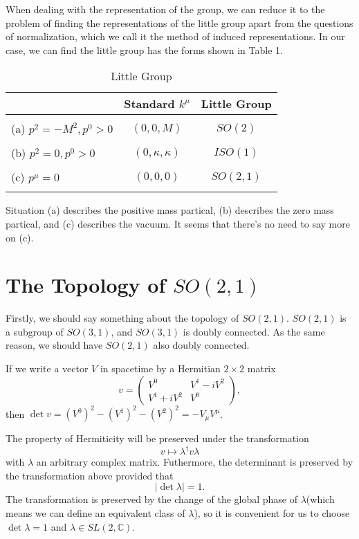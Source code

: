 \documentclass[11pt]{article}
\begin{document}
When dealing with the representation of the group, we can reduce it to the problem of finding the representations of the little group apart from the questions of normalization, which we call it the method of induced representations.\cite{2} In our case, we can find the little group has the forms shown in Table 1.
\begin{table}[ht]
\centering
\begin{tabular}{l c c}
&Standard $k^\mu$ & Little Group\\
\hline \\
(a) $p^2=-M^2,p^0>0$ & $(0,0,M)$ & $SO\left(2\right)$\\
\\
(b) $p^2=0,p^0>0$ & $(0,\kappa,\kappa)$ & $ISO\left(1\right)$\\
\\
(c) $p^\mu=0$ & $(0,0,0)$ & $SO\left(2,1\right)$\\
\\
\hline
\end{tabular}
\caption{Little Group}
\end{table}

Situation (a) describes the positive mass partical, (b) describes the zero mass partical, and (c) describes the vacuum. It seems that there's no need to say more on (c).

\section{The Topology of $SO(2,1)$}
Firstly, we should say something about the topology of $SO(2,1)$. $SO(2,1)$ is a subgroup of $SO(3,1)$, and $SO(3,1)$ is doubly connected. As the same reason, we should have  $SO(2,1)$ also doubly connected.

If we write a vector $V$ in spacetime by a Hermitian $2\times 2$ matrix
\[
	v=\begin{pmatrix}
		V^0&V^1-iV^2\\
		V^1+iV^2&V^0
	\end{pmatrix},
\]
then $\det v=(V^0)^2-(V^1)^2-(V^2)^2=-V_\mu V^\mu$.

The property of Hermiticity will be preserved under the transformation
\[
	v \mapsto \lambda^\dag v \lambda
\]
with $\lambda$ an arbitrary complex matrix. Futhermore, the determinant is preserved by the transformation above provided that
\[
\left|\det \lambda\right|=1.
\]
The transformation is preserved by the change of the global phase of $\lambda$(which means we can define an equivalent class of $\lambda$), so it is convenient for us to choose $\det \lambda=1$ and $\lambda \in SL(2,\mathbb{C})$.
\end{document}
